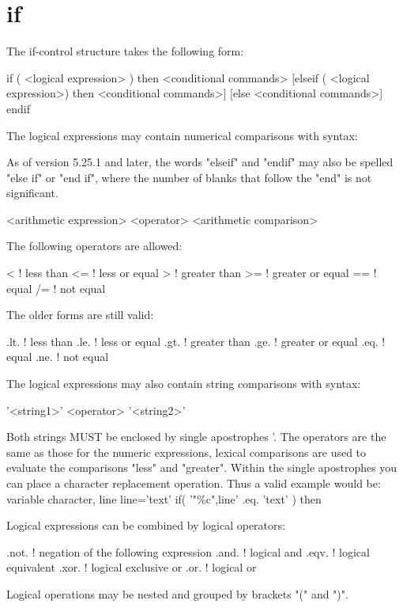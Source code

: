 \section{if}
The if-control structure takes the following form: 
\par
\begin{MacVerbatim}
if ( <logical expression> ) then
  <conditional commands>
[elseif ( <logical expression>) then
  <conditional commands>]
[else
  <conditional commands>]
endif
\end{MacVerbatim}
The logical expressions may contain numerical comparisons with syntax: 
\par
As of version 5.25.1 and later, the words "elseif" and "endif" 
may also be spelled "else if" or "end if", where the number of blanks 
that follow the "end" is not significant. 
\par
\begin{MacVerbatim}
<arithmetic expression> <operator> <arithmetic comparison>
\end{MacVerbatim}
The following operators are allowed: 
\par
\begin{MacVerbatim}
 <      ! less than
 <=     ! less or equal
 >      ! greater than
 >=     ! greater or equal
 ==     ! equal
 /=     ! not equal
\end{MacVerbatim}
The older forms are still valid: 
\begin{MacVerbatim}
.lt.    ! less than
.le.    ! less or equal
.gt.    ! greater than
.ge.    ! greater or equal
.eq.    ! equal
.ne.    ! not equal
\end{MacVerbatim}
The logical expressions may also contain string comparisons with syntax: 
\par
\begin{MacVerbatim}
'<string1>' <operator> '<string2>'
\end{MacVerbatim}
Both strings MUST be enclosed by single apostrophes '. The operators 
are the same as those for the numeric expressions, lexical comparisons 
are used to evaluate the comparisons "less" and "greater". 
Within the single apostrophes you can place a character replacement 
operation. Thus a valid example would be: 
variable character, line 
line='text' 
if( '"\%c",line' .eq. 'text' ) then 
\par
Logical expressions can be combined by logical operators: 
\par
\begin{MacVerbatim}
.not.   ! negation of the following expression
.and.   ! logical and
.eqv.   ! logical equivalent
.xor.   ! logical exclusive or
.or.    ! logical or
\end{MacVerbatim}
Logical operations may be nested and grouped by brackets "(" and ")". 
